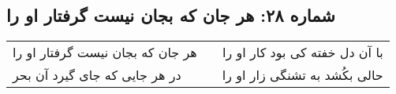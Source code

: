 \begin{center}
\section*{شماره ۲۸: هر جان که بجان نیست گرفتار او را}
\label{sec:028}
\begin{longtable}{l p{0.5cm} r}
هر جان که بجان نیست گرفتار او را
&&
با آن دل خفته کی بود کار او را
\\
در هر جایی که جای گیرد آن بحر
&&
حالی بکُشد به تشنگی زار او را
\\
\end{longtable}
\end{center}
